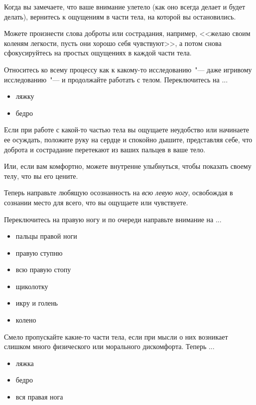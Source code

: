 \begin{itemize}
	\itemdiamondsuit Когда вы замечаете, что ваше внимание улетело (как оно всегда делает и будет делать), вернитесь к ощущениям в части тела, на которой вы остановились.
	
	\itemdiamondsuit Можете произнести слова доброты или сострадания, например, <<желаю своим коленям легкости, пусть они хорошо себя чувствуют>>, а потом снова сфокусируйтесь на простых ощущениях в каждой части тела.
	
	\itemdiamondsuit Относитесь ко всему процессу как к какому-то исследованию~"--- даже игривому исследованию~"--- и продолжайте работать с телом. Переключитесь на ...
	\begin{itemize}
		\item ляжку
		\item бедро
	\end{itemize}
	
	\itemdiamondsuit Если при работе с какой-то частью тела вы ощущаете неудобство или начинаете ее осуждать, положите руку на сердце и спокойно дышите, представляя себе, что доброта и сострадание перетекают из ваших пальцев в ваше тело.
	
	\itemdiamondsuit Или, если вам комфортно, можете внутренне улыбнуться, чтобы показать своему телу, что вы его цените.
	
	\itemdiamondsuit Теперь направьте любящую осознанность на \emph{всю левую ногу}, освобождая в сознании место для всего, что вы ощущаете или чувствуете.
	
	\itemdiamondsuit Переключитесь на правую ногу и по очереди направьте внимание на ...
	\begin{itemize}
		\item пальцы правой ноги
		\item правую ступню
		\item всю правую стопу
		\item щиколотку
		\item икру и голень
		\item колено
	\end{itemize}
	
	\itemdiamondsuit Смело пропускайте какие-то части тела, если при мысли о них возникает слишком много физического или морального дискомфорта. Теперь ...
	\begin{itemize}
		\item ляжка
		\item бедро
		\item вся правая нога
	\end{itemize}
	

\end{itemize}

